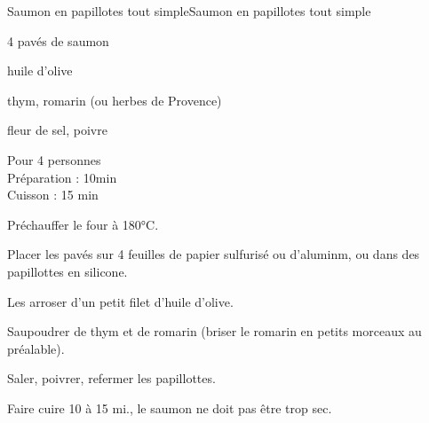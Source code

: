 \begin{recette}{Saumon en papillotes tout simple}{Saumon en papillotes tout simple}

\begin{ingredients}
4 pavés de saumon\par
huile d'olive\par
thym, romarin (ou herbes de Provence)\par
fleur de sel, poivre\par
\end{ingredients}

\begin{infos}
Pour 4 personnes\\
Préparation : 10min\\
Cuisson : 15 min\\
\end{infos}

\begin{etapes}
\item Préchauffer le four à 180°C.
\item Placer les pavés sur 4 feuilles de papier sulfurisé ou d'aluminm, ou dans des papillottes en silicone.
\item Les arroser d'un petit filet d'huile d'olive.
\item Saupoudrer de thym et de romarin (briser le romarin en petits morceaux au préalable).
\item Saler, poivrer, refermer les papillottes.
\item Faire cuire 10 à 15 mi., le saumon ne doit pas être trop sec.
\end{etapes}

\end{recette}